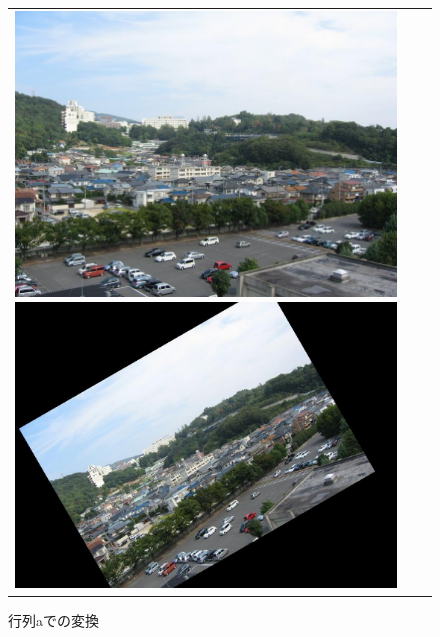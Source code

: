 \documentclass[a4j]{jarticle}
\begin{document}
\begin{figure}[htbp]
\begin{tabular}{ccc}
\begin{minipage}{0.4\hsize}
\center
\includegraphics[bb=0 0 768 576,scale=.2]{../2/0.jpg}
\caption{変換前の元画像}
\end{minipage}
\begin{minipage}{0.3\hsize}
\center
\includegraphics[bb=0 0 1024 768,scale=.13]{../2/outa.jpg}
\caption{行列aでの変換}
\end{minipage}
\begin{minipage}{0.3\hsize}
\center

\end{minipage}
\end{tabular}
\end{figure}
\end{document}
